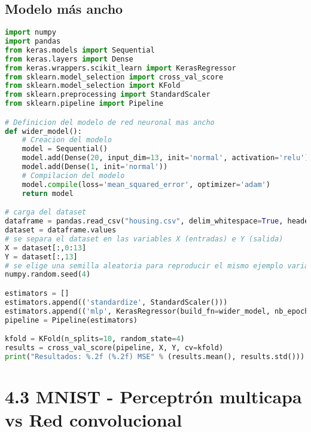 \subsection{Modelo más ancho}
\begin{lstlisting}[language=Python]
import numpy
import pandas
from keras.models import Sequential
from keras.layers import Dense
from keras.wrappers.scikit_learn import KerasRegressor
from sklearn.model_selection import cross_val_score
from sklearn.model_selection import KFold
from sklearn.preprocessing import StandardScaler
from sklearn.pipeline import Pipeline

# Definicion del modelo de red neuronal mas ancho
def wider_model():
	# Creacion del modelo
	model = Sequential()
	model.add(Dense(20, input_dim=13, init='normal', activation='relu'))
	model.add(Dense(1, init='normal'))
	# Compilacion del modelo
	model.compile(loss='mean_squared_error', optimizer='adam')
	return model

# carga del dataset
dataframe = pandas.read_csv("housing.csv", delim_whitespace=True, header=None)
dataset = dataframe.values
# se separa el dataset en las variables X (entradas) e Y (salida)
X = dataset[:,0:13]
Y = dataset[:,13]
# se elige una semilla aleatoria para reproducir el mismo ejemplo varias veces
numpy.random.seed(4)

estimators = []
estimators.append(('standardize', StandardScaler()))
estimators.append(('mlp', KerasRegressor(build_fn=wider_model, nb_epoch=100, batch_size=5, verbose=0)))
pipeline = Pipeline(estimators)

kfold = KFold(n_splits=10, random_state=4)
results = cross_val_score(pipeline, X, Y, cv=kfold)
print("Resultados: %.2f (%.2f) MSE" % (results.mean(), results.std()))
\end{lstlisting}

\section{4.3 MNIST - Perceptrón multicapa vs Red convolucional}
